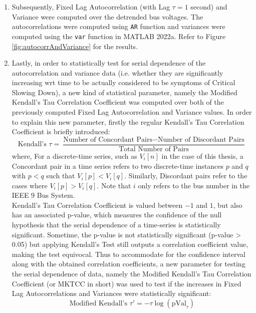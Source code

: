 \begin{enumerate}
\begin{enumerate}
			\item Subsequently, Fixed Lag Autocorrelation (with Lag $\tau = 1$ second) and Variance were computed over the detrended bus voltages. The autocorrelations were computed using \texttt{AR} function and variances were computed using the \texttt{var} function in MATLAB 2022a. Refer to Figure \ref{fig:autocorrAndVariance} for the results.
			
			\item Lastly, in order to statistically test for serial dependence of the autocorrelation and variance data (i.e. whether they are significantly increasing wrt time to be actually considered to be symptoms of Critical Slowing Down), a new kind of statistical parameter, namely the Modified Kendall's Tau Correlation Coefficient was computed over both of the previously computed Fixed Lag Autocorrelation and Variance values. In order to explain this new parameter, firstly the regular Kendall's Tau Correlation Coefficient is briefly introduced:
			\begin{equation}
				\label{eq:kenallsGeneral}
				\text{Kendall's } \tau = \frac{\text{Number of Concordant Pairs} - \text{Number of Discordant Pairs}}{\text{Total Number of Pairs}}
			\end{equation}
			\hspace{25pt} where, For a discrete-time series, such as $V_i[n]$ in the case of this thesis, a Concordant pair in a time series refers to two discrete-time instances $p$ and $q$ with $p<q$ such that $V_i[p] < V_i[q]$. Similarly, Discordant pairs refer to the cases where $V_i[p] > V_i[q]$. Note that $i$ only refers to the bus number in the IEEE 9 Bus System. \\
			Kendall's Tau Correlation Coefficient is valued between $-1$ and $1$, but also has an associated p-value, which measures the confidence of the null hypothesis that the serial dependence of a time-series is statistically significant. Sometime, the p-value is not statistically significant (p-value > 0.05) but applying Kendall's Test still outputs a correlation coefficient value, making the test equivocal. Thus to accommodate for the confidence interval along with the obtained correlation coefficients, a new parameter for testing the serial dependence of data, namely the Modified Kendall's Tau Correlation Coefficient (or MKTCC in short) was used to test if the increases in Fixed Lag Autocorrelations and Variances were statistically significant:
			\begin{equation}
				\label{eq:mktccAutocorrAndVariance}
				\text{Modified Kendall's } \tau' = -\tau \log{(\text{pVal}_{\tau})}

\end{equation}
\end{enumerate}
\end{enumerate}
